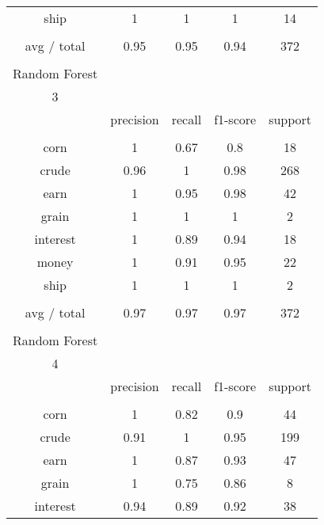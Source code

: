 \documentclass[11pt]{article}
\begin{document}
\begin{center}
\begin{longtable}{| c | c | c | c | c |}
ship          & 1         & 1      & 1        & 14      \\
             &           &        &          &         \\
avg / total   & 0.95      & 0.95   & 0.94     & 372     \\
             &           &        &          &         \\
Random Forest &           &        &          &         \\
3             &           &        &          &         \\
             & precision & recall & f1-score & support \\
             &           &        &          &         \\
corn          & 1         & 0.67   & 0.8      & 18      \\
crude         & 0.96      & 1      & 0.98     & 268     \\
earn          & 1         & 0.95   & 0.98     & 42      \\
grain         & 1         & 1      & 1        & 2       \\
interest      & 1         & 0.89   & 0.94     & 18      \\
money         & 1         & 0.91   & 0.95     & 22      \\
ship          & 1         & 1      & 1        & 2       \\
             &           &        &          &         \\
avg / total   & 0.97      & 0.97   & 0.97     & 372     \\
             &           &        &          &         \\
Random Forest &           &        &          &         \\
4             &           &        &          &         \\
             & precision & recall & f1-score & support \\
             &           &        &          &         \\
corn          & 1         & 0.82   & 0.9      & 44      \\
crude         & 0.91      & 1      & 0.95     & 199     \\
earn          & 1         & 0.87   & 0.93     & 47      \\
grain         & 1         & 0.75   & 0.86     & 8       \\
interest      & 0.94      & 0.89   & 0.92     & 38      \\

\end{longtable}
\end{center}
\end{document}
